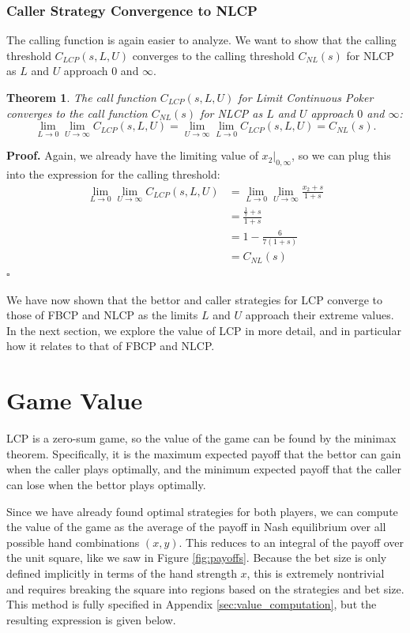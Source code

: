 \documentclass[a4paper,12pt]{article}
\theoremstyle{plain}
\newtheorem{theorem}{Theorem}[section]
\theoremstyle{definition}
\newenvironment{customproof}[1][Proof]{\noindent\textbf{#1.} }{\hfill$\square$\vspace{1em}}
\begin{document}
\subsubsection{Caller Strategy Convergence to NLCP}

The calling function is again easier to analyze. We want to show that the calling threshold $C_{LCP}(s, L, U)$ converges to the calling threshold $C_{NL}(s)$ for NLCP as $L$ and $U$ approach $0$ and $\infty$.
\begin{theorem}
    The call function $C_{LCP}(s, L, U)$ for Limit Continuous Poker converges to the call function $C_{NL}(s)$ for NLCP as $L$ and $U$ approach $0$ and $\infty$:
\[
\lim_{L \to 0} \lim_{U \to \infty} C_{LCP}(s, L, U) = \lim_{U \to \infty} \lim_{L \to 0} C_{LCP}(s, L, U) = C_{NL}(s).
\]
\end{theorem}
\begin{customproof}
Again, we already have the limiting value of $x_2|_{0,\infty}$, so we can plug this into the expression for the calling threshold:
\begin{align*}
    \lim_{L \to 0} \lim_{U \to \infty} C_{LCP}(s, L, U) & = \lim_{L \to 0} \lim_{U \to \infty} \frac{x_2+s}{1+s}\\
    & = \frac{\frac{1}{7}+s}{1+s}\\
    & = 1 - \frac{6}{7(1+s)}\\
    & = C_{NL}(s)
\end{align*}
\end{customproof}

We have now shown that the bettor and caller strategies for LCP converge to those of FBCP and NLCP as the limits $L$ and $U$ approach their extreme values. In the next section, we explore the value of LCP in more detail, and in particular how it relates to that of FBCP and NLCP.

\section{Game Value}
\label{sec:game_value}

LCP is a zero-sum game, so the value of the game can be found by the minimax theorem. Specifically, it is the maximum expected payoff that the bettor can gain when the caller plays optimally, and the minimum expected payoff that the caller can lose when the bettor plays optimally.

Since we have already found optimal strategies for both players, we can compute the value of the game as the average of the payoff in Nash equilibrium over all possible hand combinations $(x, y)$. This reduces to an integral of the payoff over the unit square, like we saw in Figure \ref{fig:payoffs}. Because the bet size is only defined implicitly in terms of the hand strength $x$, this is extremely nontrivial and requires breaking the square into regions based on the strategies and bet size. This method is fully specified in Appendix \ref{sec:value_computation}, but the resulting expression is given below.
\end{document}
